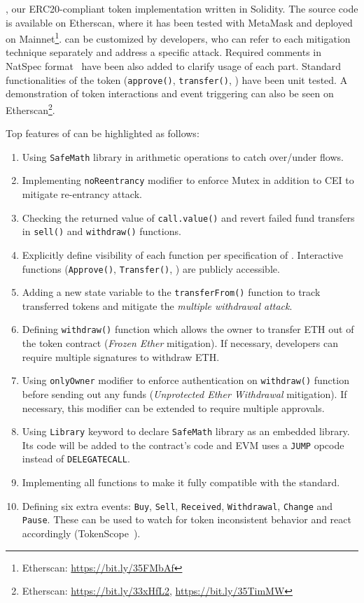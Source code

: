 \sys, our ERC20-compliant token implementation written in Solidity. The source code is available on Etherscan, where it has been tested with MetaMask and deployed on Mainnet\footnote{Etherscan: \url{https://bit.ly/35FMbAf}}. \sys can be customized by developers, who can refer to each mitigation technique separately and address a specific attack. Required comments in NatSpec format~\cite{NatSpec} have been also added to clarify usage of each part. Standard functionalities of the token (\ie \texttt{approve()}, \texttt{transfer()}, \etc) have been unit tested. A demonstration of token interactions and event triggering can also be seen on Etherscan\footnote{Etherscan: \url{https://bit.ly/33xHfL2}, \url{https://bit.ly/35TimMW}}. {\blue Top features of \sys can be highlighted as follows:
\begin{enumerate}[noitemsep,topsep=0pt]
	\item Using \texttt{SafeMath} library in arithmetic operations to catch over/under flows.
	\item Implementing \texttt{noReentrancy} modifier to enforce Mutex in addition to CEI to mitigate re-entrancy attack.
	\item Checking the returned value of \texttt{call.value()} and revert failed fund transfers in \texttt{sell()} and \texttt{withdraw()} functions.
	\item Explicitly define visibility of each function per specification of \erc. Interactive functions (\eg \texttt{Approve()}, \texttt{Transfer()}, \etc) are publicly accessible.
	\item Adding a new state variable to the \texttt{transferFrom()} function to track transferred tokens and mitigate the \textit{multiple withdrawal attack}. 
	\item Defining \texttt{withdraw()} function which allows the owner to transfer ETH out of the token contract (\textit{Frozen Ether} mitigation). If necessary, developers can require multiple signatures to withdraw ETH.
	\item Using \texttt{onlyOwner} modifier to enforce authentication on \texttt{withdraw()} function before sending out any funds (\textit{Unprotected Ether Withdrawal} mitigation). If necessary, this modifier can be extended to require multiple approvals.
	\item Using \texttt{Library} keyword to declare \texttt{SafeMath} library as an embedded library. Its code will be added to the \erc contract's code and EVM uses a \texttt{JUMP} opcode instead of \texttt{DELEGATECALL}.
	\item Implementing all functions to make it fully compatible with the standard.
	\item Defining six extra events: \texttt{Buy}, \texttt{Sell}, \texttt{Received}, \texttt{Withdrawal}, \texttt{Change} and \texttt{Pause}. These can be used to watch for token inconsistent behavior and react accordingly (\cf TokenScope~\cite{TokenScope}).
\end{enumerate}

}
